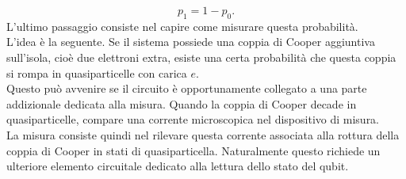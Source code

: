\[
p_1=1-p_0.
\]
L'ultimo passaggio consiste nel capire come misurare questa probabilità.\\
L'idea è la seguente. Se il sistema possiede una coppia di Cooper aggiuntiva sull'isola, cioè due elettroni extra, esiste una certa probabilità che questa coppia si rompa in quasiparticelle con carica $e$.\\
Questo può avvenire se il circuito è opportunamente collegato a una parte addizionale dedicata alla misura. Quando la coppia di Cooper decade in quasiparticelle, compare una corrente microscopica nel dispositivo di misura.\\
La misura consiste quindi nel rilevare questa corrente associata alla rottura della coppia di Cooper in stati di quasiparticella. Naturalmente questo richiede un ulteriore elemento circuitale dedicato alla lettura dello stato del qubit.
